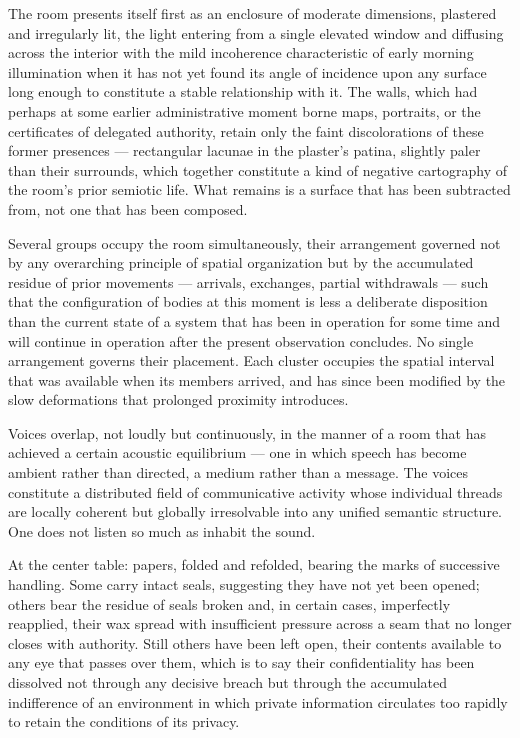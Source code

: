 \documentclass[12pt, oneside]{article}
\newcommand{\sceneheading}[1]{%
  \vspace{1.8em}%
  \noindent{\bfseries\large\MakeUppercase{#1}}%
  \vspace{0.6em}%
  \par\noindent{\color{rulecolor}\rule{\linewidth}{0.3pt}}%
  \vspace{0.5em}\par%
}
\newenvironment{action}{%
  \vspace{0.6em}%
  \noindent\ignorespaces%
}{%
  \par\vspace{0.6em}%
}
\begin{document}
\sceneheading{INT. Diplomatic Antechamber — Day}

\begin{action}
The room presents itself first as an enclosure of moderate dimensions, plastered and irregularly lit, the light entering from a single elevated window and diffusing across the interior with the mild incoherence characteristic of early morning illumination when it has not yet found its angle of incidence upon any surface long enough to constitute a stable relationship with it. The walls, which had perhaps at some earlier administrative moment borne maps, portraits, or the certificates of delegated authority, retain only the faint discolorations of these former presences --- rectangular lacunae in the plaster's patina, slightly paler than their surrounds, which together constitute a kind of negative cartography of the room's prior semiotic life. What remains is a surface that has been subtracted from, not one that has been composed.

Several groups occupy the room simultaneously, their arrangement governed not by any overarching principle of spatial organization but by the accumulated residue of prior movements --- arrivals, exchanges, partial withdrawals --- such that the configuration of bodies at this moment is less a deliberate disposition than the current state of a system that has been in operation for some time and will continue in operation after the present observation concludes. No single arrangement governs their placement. Each cluster occupies the spatial interval that was available when its members arrived, and has since been modified by the slow deformations that prolonged proximity introduces.
\end{action}

\begin{action}
Voices overlap, not loudly but continuously, in the manner of a room that has achieved a certain acoustic equilibrium --- one in which speech has become ambient rather than directed, a medium rather than a message. The voices constitute a distributed field of communicative activity whose individual threads are locally coherent but globally irresolvable into any unified semantic structure. One does not listen so much as inhabit the sound.

At the center table: papers, folded and refolded, bearing the marks of successive handling. Some carry intact seals, suggesting they have not yet been opened; others bear the residue of seals broken and, in certain cases, imperfectly reapplied, their wax spread with insufficient pressure across a seam that no longer closes with authority. Still others have been left open, their contents available to any eye that passes over them, which is to say their confidentiality has been dissolved not through any decisive breach but through the accumulated indifference of an environment in which private information circulates too rapidly to retain the conditions of its privacy.
\end{action}
\end{document}
